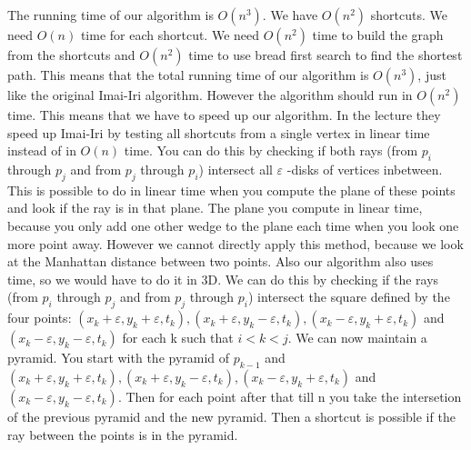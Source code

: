 
The running time of our algorithm is $O(n^{3})$. 
We have $O(n^{2})$ shortcuts. 
We need $O(n)$ time for each shortcut. 
We need $O(n^{2})$ time to build the graph from the shortcuts and $O(n^{2})$ time to use bread first search to find the shortest path. 
This means that the total running time of our algorithm is $O(n^{3})$, just like the original Imai-Iri algorithm. 
However the algorithm should run in $O(n^{2})$ time. 
This means that we have to speed up our algorithm.
In the lecture they speed up Imai-Iri by testing all shortcuts from a single vertex in linear time instead of in $O(n)$ time. 
You can do this by checking if both rays (from $p_{i}$ through $p_{j}$ and from $p_{j}$ through $p_{i}$) intersect all $\varepsilon$ -disks of vertices inbetween. This is possible to do in linear time when you compute the plane of these points and look if the ray is in that plane. The plane you compute in linear time, because you only add one other wedge to the plane each time when you look one more point away. 
However we cannot directly apply this method, because we look at the Manhattan distance between two points. Also our algorithm also uses time, so we would have to do it in 3D. 
We can do this by checking if the rays (from $p_{i}$ through $p_{j}$ and from $p_{j}$ through $p_{i}$) intersect the square defined by the four points: 
$(x_{k}+\varepsilon,y_{k}+\varepsilon,t_{k}), (x_{k}+\varepsilon,y_{k}-\varepsilon,t_{k}), (x_{k}-\varepsilon,y_{k}+\varepsilon,t_{k})$ and $(x_{k}-\varepsilon,y_{k}-\varepsilon,t_{k})$ for each k such that $i<k<j$. We can now maintain a pyramid. You start with the pyramid of $p_{k-1}$ and  $(x_{k}+\varepsilon,y_{k}+\varepsilon,t_{k}), (x_{k}+\varepsilon,y_{k}-\varepsilon,t_{k}), (x_{k}-\varepsilon,y_{k}+\varepsilon,t_{k})$ and $(x_{k}-\varepsilon,y_{k}-\varepsilon,t_{k})$. 
Then for each point after that till n you take the intersetion of the previous pyramid and the new pyramid. 
Then a shortcut is possible if the ray between the points is in the pyramid. 
